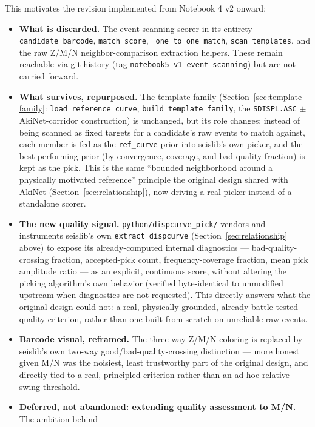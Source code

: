\documentclass[11pt]{article}
\begin{document}
This motivates the revision implemented from Notebook 4 v2 onward:

\begin{itemize}[nosep]
  \item \textbf{What is discarded.} The event-scanning scorer in its entirety ---
    \texttt{candidate\_barcode}, \texttt{match\_score}, \texttt{\_one\_to\_one\_match},
    \texttt{scan\_templates}, and the raw Z/M/N neighbor-comparison extraction helpers. These
    remain reachable via git history (tag \texttt{notebook5-v1-event-scanning}) but are not carried
    forward.
  \item \textbf{What survives, repurposed.} The template family
    (Section~\ref{sec:template-family}: \texttt{load\_reference\_curve}, \texttt{build\_template\_family},
    the \texttt{SDISPL.ASC} $\pm$ AkiNet-corridor construction) is unchanged, but its role changes:
    instead of being scanned as fixed targets for a candidate's raw events to match against, each
    member is fed as the \texttt{ref\_curve} prior into seislib's own picker, and the
    best-performing prior (by convergence, coverage, and bad-quality fraction) is kept as the pick.
    This is the same ``bounded neighborhood around a physically motivated reference'' principle the
    original design shared with AkiNet (Section~\ref{sec:relationship}), now driving a real picker
    instead of a standalone scorer.
  \item \textbf{The new quality signal.} \texttt{python/dispcurve\_pick/} vendors and instruments
    seislib's own \texttt{extract\_dispcurve} (Section~\ref{sec:relationship} above) to expose its
    already-computed internal diagnostics --- bad-quality-crossing fraction, accepted-pick count,
    frequency-coverage fraction, mean pick amplitude ratio --- as an explicit, continuous score,
    without altering the picking algorithm's own behavior (verified byte-identical to unmodified
    upstream when diagnostics are not requested). This directly answers what the original design
    could not: a real, physically grounded, already-battle-tested quality criterion, rather than
    one built from scratch on unreliable raw events.
  \item \textbf{Barcode visual, reframed.} The three-way Z/M/N coloring is replaced by seislib's
    own two-way good/bad-quality-crossing distinction --- more honest given M/N was the noisiest,
    least trustworthy part of the original design, and directly tied to a real, principled
    criterion rather than an ad hoc relative-swing threshold.
  \item \textbf{Deferred, not abandoned: extending quality assessment to M/N.} The ambition behind

\end{itemize}
\end{document}
